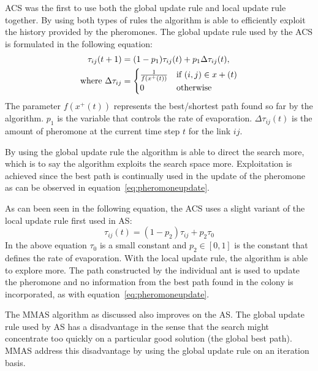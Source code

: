 \gls{ACS} was the first to use both the global update rule and local update rule together\cite{CompuIntelligenceIntro}. By using both types of rules the algorithm is able to efficiently exploit the history provided by the pheromones\cite{CompuIntelligenceIntro}. The global update rule used by the \gls{ACS} is formulated in the following equation\cite{CompuIntelligenceIntro}:
\begin{align}
\label{eq:pheromoneupdate}
	\tau_{ij}(t + 1) &= (1 - p_1)\tau_{ij}(t) + p_1\Delta\tau_{ij}(t),\\
	\text{where }\Delta\tau_{ij} &= \notag
	\begin{cases}
		\frac{1}{f(x^+(t))} &\text{if $(i,j) \in x+(t)$}\\
		0 &\text{otherwise}
	\end{cases}
\end{align}
The parameter $f(x^+(t))$ represents the best/shortest path found so far by the algorithm\cite{CompuIntelligenceIntro}. $p_1$ is the variable that controls the rate of evaporation. $\Delta\tau_{ij}(t)$ is the amount of pheromone at the current time step $t$ for the link $ij$.

By using the global update rule the algorithm is able to direct the search more, which is to say the algorithm exploits the search space more. Exploitation is achieved since the best path is continually used in the update of the pheromone as can be observed in equation~\ref{eq:pheromoneupdate}\cite{CompuIntelligenceIntro,FundamentalSwarm}.

As can been seen in the following equation, the \gls{ACS} uses a slight variant of the local update rule first used in \gls{AS}\cite{CompuIntelligenceIntro}:
\begin{equation}
	\tau_{ij}(t) = (1 - p_2)\tau_{ij} + p_2\tau_0
\end{equation}
In the above equation $\tau_0$ is a small constant and $p_2 \in [0,1]$ is the constant that defines the rate of evaporation\cite{CompuIntelligenceIntro}. With the local update rule, the algorithm is able to explore more. The path constructed by the individual ant is used to update the pheromone and no information from the best path found in the colony is incorporated, as with equation~\ref{eq:pheromoneupdate}\cite{CompuIntelligenceIntro,FundamentalSwarm}.

The \gls{MMAS} algorithm as discussed also improves on the \gls{AS}. The global update rule used by \gls{AS} has a disadvantage in the sense that the search might concentrate too quickly on a particular good solution (the global best path)\cite{FundamentalSwarm}. \gls{MMAS} address this disadvantage by using the global update rule on an iteration basis\cite{FundamentalSwarm}.

